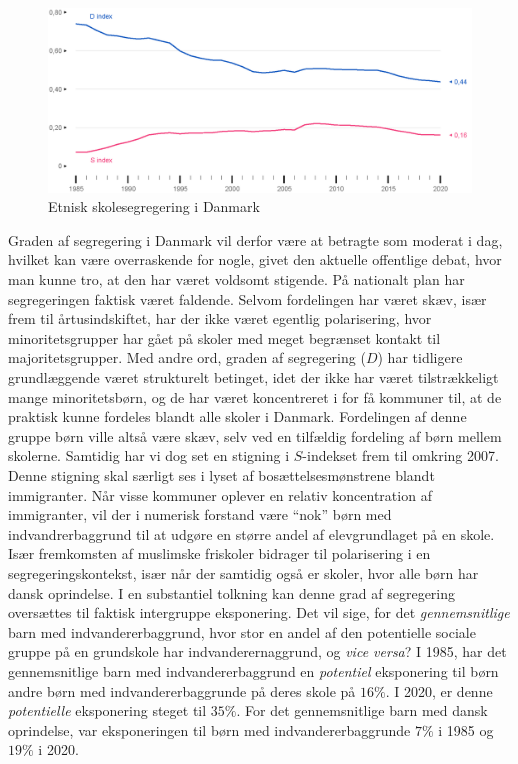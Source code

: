 \documentclass[
]{book}
\begin{document}
\begin{figure}
\includegraphics[width=1\linewidth]{images/figur_3_2} \caption{Etnisk skolesegregering i Danmark}\label{fig:fig-3-2}
\end{figure}

Graden af segregering i Danmark vil derfor være at betragte som moderat i dag, hvilket kan være overraskende for nogle, givet den aktuelle offentlige debat, hvor man kunne tro, at den har været voldsomt stigende. På nationalt plan har segregeringen faktisk været faldende. Selvom fordelingen har været skæv, især frem til årtusindskiftet, har der ikke været egentlig polarisering, hvor minoritetsgrupper har gået på skoler med meget begrænset kontakt til majoritetsgrupper. Med andre ord, graden af segregering (\(D\)) har tidligere grundlæggende været strukturelt betinget, idet der ikke har været tilstrækkeligt mange minoritetsbørn, og de har været koncentreret i for få kommuner til, at de praktisk kunne fordeles blandt alle skoler i Danmark. Fordelingen af denne gruppe børn ville altså være skæv, selv ved en tilfældig fordeling af børn mellem skolerne. Samtidig har vi dog set en stigning i \(S\)-indekset frem til omkring 2007. Denne stigning skal særligt ses i lyset af bosættelsesmønstrene blandt immigranter. Når visse kommuner oplever en relativ koncentration af immigranter, vil der i numerisk forstand være ``nok'' børn med indvandrerbaggrund til at udgøre en større andel af elevgrundlaget på en skole. Især fremkomsten af muslimske friskoler bidrager til polarisering i en segregeringskontekst, især når der samtidig også er skoler, hvor alle børn har dansk oprindelse. I en substantiel tolkning kan denne grad af segregering oversættes til faktisk intergruppe eksponering. Det vil sige, for det \emph{gennemsnitlige} barn med indvandererbaggrund, hvor stor en andel af den potentielle sociale gruppe på en grundskole har indvanderernaggrund, og \emph{vice versa}? I 1985, har det gennemsnitlige barn med indvandererbaggrund en \emph{potentiel} eksponering til børn andre børn med indvandererbaggrunde på deres skole på \(16\%\). I 2020, er denne \emph{potentielle} eksponering steget til \(35\%\). For det gennemsnitlige barn med dansk oprindelse, var eksponeringen til børn med indvandererbaggrunde \(7\%\) i 1985 og \(19\%\) i 2020.
\end{document}
